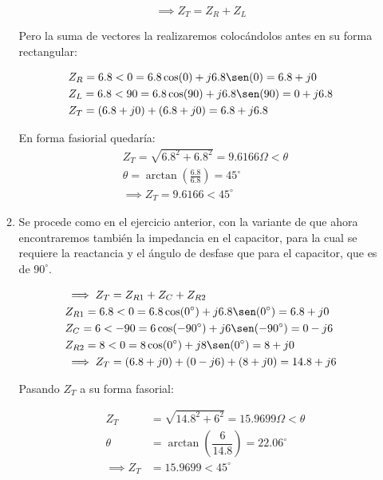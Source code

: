 \begin{enumerate}
\begin{enumerate}
		            \begin{equation}
			            \implies  Z_T= Z_R + Z_L
		            \end{equation}

		            Pero la suma de vectores la realizaremos colocándolos antes en su forma rectangular:

		            \begin{align*}
			             & Z_R=6.8<0= 6.8\cos(0)+j6.8\sen(0)=6.8+j0    \\
			             & Z_L=6.8<90= 6.8\cos(90)+j6.8\sen(90)=0+j6.8 \\
			             & Z_T=(6.8+j0)+(6.8+j0)= 6.8+j6.8
		            \end{align*}

		            En forma fasiorial quedaría:
		            \begin{align*}
			             & Z_T= \sqrt{6.8^2+6.8^2}=9.6166 \Omega <\theta             \\
			             & \theta = \arctan \left(\frac{6.8}{6.8}\right)= 45^{\circ} \\
			             & \implies Z_T=9.6166 < 45^{\circ}
		            \end{align*}


		      \item Se procede como en el ejercicio anterior, con la variante de que ahora encontraremos también la impedancia en el capacitor, para la cual se requiere la reactancia y el ángulo de desfase que para el capacitor, que es de $90^{\circ}$.

		            \begin{align*}
			             & \implies  Z_T= Z_{R1} +  Z_C + Z_{R2}                         \\
			             & Z_{R1}=6.8<0= 6.8\cos(0^{\circ} )+j6.8\sen(0^{\circ} )=6.8+j0 \\
			             & Z_C=6<-90= 6\cos(-90^{\circ} )+j6\sen(-90^{\circ} )=0-j6      \\
			             & Z_{R2}=8<0= 8\cos(0^{\circ} )+j8\sen(0^{\circ} )=8+j0         \\
			             & \implies  Z_T=(6.8+j0)+(0-j6)+(8+j0)=14.8+j6
		            \end{align*}

		            Pasando $Z_T$ a su forma fasorial:

		            \begin{align*}
			             & Z_T          & = \sqrt{14.8^2+6^2}=15.9699 \Omega <\theta             \\
			             & \theta       & = \arctan \left( \dfrac{6}{14.8}\right)= 22.06^{\circ} \\
			             & \implies Z_T & =15.9699 < 45^{\circ}
		            \end{align*}


\end{enumerate}
\end{enumerate}
